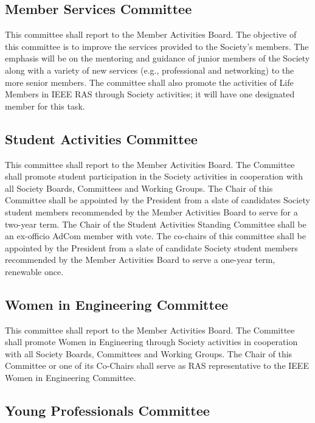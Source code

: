 \documentclass[10pt]{article}
\begin{document}
\subsection{Member Services Committee}
This committee shall report to the Member Activities Board. The objective of this committee is to improve the services provided to the Society's members. The emphasis will be on the mentoring and guidance of junior members of the Society along with a variety of new services (e.g., professional and networking) to the more senior members. The committee shall also promote the activities of Life Members in IEEE RAS through Society activities; it will have one designated member for this task. %


\subsection{Student Activities Committee}

This committee shall report to the Member Activities Board. The Committee shall promote student participation in the Society activities in cooperation with all Society Boards, Committees and Working Groups. The Chair of this Committee shall be appointed by the President from a slate of candidates Society student members recommended by the Member Activities Board to serve for a two-year term. The Chair of the Student Activities Standing Committee shall be an ex-officio AdCom member with vote. The co-chairs of this committee shall be appointed by the President from a slate of candidate Society student members recommended by the Member Activities Board to serve a one-year term, renewable once.


\subsection{Women in Engineering Committee}

This committee shall report to the Member Activities Board. The Committee shall promote Women in Engineering through Society activities in cooperation with all Society Boards, Committees and Working Groups. The Chair of this Committee or one of its Co-Chairs shall serve as RAS representative to the IEEE Women in Engineering Committee.


\subsection{Young Professionals Committee}
\end{document}

